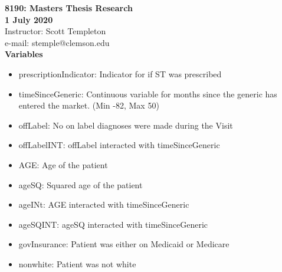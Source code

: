 
\let\counterwithout\relax
\let\counterwithin\relax
{}



\noindent \textbf{8190: Masters Thesis Research}\\
\noindent \textbf{1 July 2020}\\
\noindent Instructor: Scott Templeton \\
e-mail: stemple@clemson.edu\\

\noindent \textbf{Variables}\\
\begin{itemize}
    \item prescriptionIndicator: Indicator for if ST was prescribed
    \item timeSinceGeneric: Continuous variable for months since the generic has entered the market. (Min -82, Max 50)
    \item offLabel: No on label diagnoses were made during the Visit
    \item offLabelINT: offLabel interacted with timeSinceGeneric
    \item AGE: Age of the patient
    \item ageSQ: Squared age of the patient
    \item ageINt: AGE interacted with timeSinceGeneric
    \item ageSQINT: ageSQ interacted with timeSinceGeneric
    \item govInsurance: Patient was either on Medicaid or Medicare
    \item nonwhite: Patient was not white
\end{itemize}






